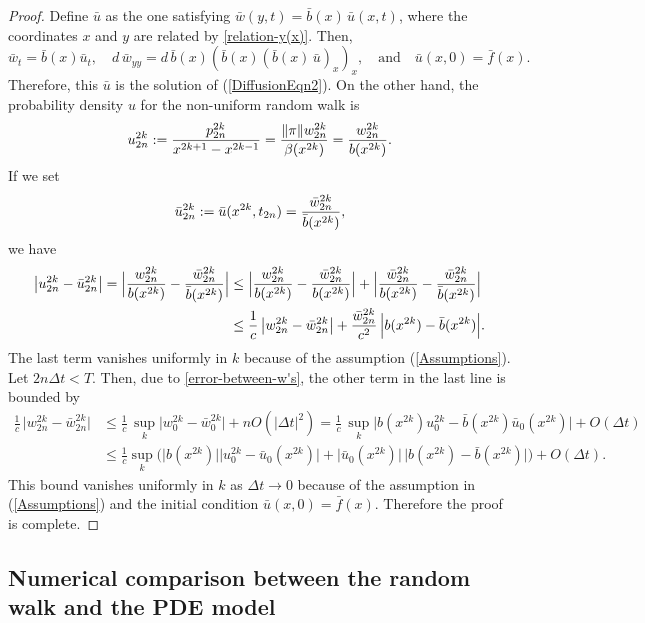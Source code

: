 \documentclass[11pt]{amsart}
\def\d{d}
\begin{document}
\begin{proof}
Define $\bar u$ as the one satisfying $\bar{w}(y,t) =\bar b(x) \,\bar u(x,t)$, where the coordinates $x$ and $y$ are related by \eqref{relation-y(x)}. Then,
$$
\bar w_t=\bar b(x)\bar u_t,\quad \d\,\bar w_{yy}= \d\,\bar b(x)(\bar b(x)(\bar b(x) \,\bar u)_x)_x,\quad\text{and}\quad \bar u(x,0)=\bar f(x) .
$$
Therefore, this $\bar u$ is the solution of (\ref{DiffusionEqn2}). On the other hand, the probability density $u$ for the non-uniform random walk is
\[
u^{2k}_{2n}:={p^{2k}_{2n}\over x^{2k+1}-x^{2k-1}} = {\|\pi\|w_{2n}^{2k}\over\beta(x^{2k})}={w_{2n}^{2k}\over b(x^{2k})}.
\]
If we set
\[\bar u^{2k}_{2n} :=\bar u(x^{2k},t_{2n}) = {\bar{w}^{2k}_{2n}\over\bar b(x^{2k})}, \]
we have
\[
\begin{split}
\big| u^{2k}_{2n}-\bar{u}^{2k}_{2n} \big|=\Big|{w_{2n}^{2k}\over b(x^{2k})}-{\bar{w}^{2k}_{2n}\over\bar b(x^{2k})}\Big| &\le \Big|{w_{2n}^{2k}\over b(x^{2k})}-{\bar{w}^{2k}_{2n}\over b(x^{2k})}
\Big|+\Big|{\bar w_{2n}^{2k}\over b(x^{2k})}-{\bar{w}^{2k}_{2n}\over\bar b(x^{2k})}  \Big|\ \\
&\le \frac{1}{c} \,\big| w^{2k}_{2n} -\bar{w}^{2k}_{2n} \big| + \frac{\bar{w}^{2k}_{2n}}{c^2} \,\Big| b(x^{2k})-\bar b(x^{2k})  \Big|.
\end{split}
\]
The last term vanishes uniformly in $k$ because of the assumption (\ref{Assumptions}). Let $2n\Delta t<T$. Then, due to \eqref{error-between-w's}, the other term in the last line is bounded by
\[\begin{split}
\frac{1}{c} \,\big| w^{2k}_{2n} -\bar{w}^{2k}_{2n} \big| &\le
\frac{1}{c} \, \sup_k \big| w^{2k}_0 -\bar{w}^{2k}_0 \big| +nO(|\Delta t|^2)= \frac{1}{c} \, \sup_k \big| b(x^{2k})u^{2k}_0 -\bar b(x^{2k})\bar{u}_0(x^{2k}) \big| +O(\Delta t)\\
&\le\frac{1}{c}\sup_k\Big(\big|b(x^{2k})\big|\big|u^{2k}_0-\bar{u}_0(x^{2k})\big| +\big|\bar{u}_0(x^{2k})\big|\,\big|b(x^{2k}) -\bar b(x^{2k})\big|\Big)+O(\Delta t).
\end{split}\]
This bound vanishes uniformly in $k$ as $\Delta t \to 0$ because of the assumption in (\ref{Assumptions}) and the initial condition $\bar u(x,0)=\bar f(x)$. Therefore the proof is complete.
\end{proof}


\subsection{Numerical comparison between the random walk and the PDE model}
\end{document}
